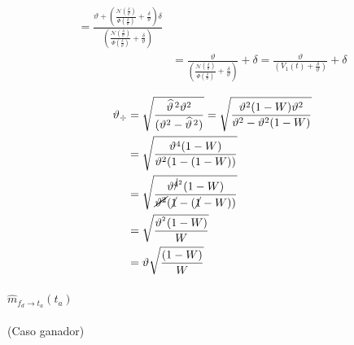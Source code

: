 \documentclass[11pt,twoside,spanish]{report} %
\begin{document}
\begin{equation}
\begin{split}
		=   \frac{\vartheta +\left(\frac{\mathcal{N}(\frac{\delta}{\vartheta})}{\Phi(\frac{\delta}{\vartheta})}+ \frac{\delta}{\vartheta}\right)\delta}  {\left(\frac{\mathcal{N}(\frac{\delta}{\vartheta})}{\Phi(\frac{\delta}{\vartheta})}+ \frac{\delta}{\vartheta}\right) }\\
		&=   \frac{\vartheta}  {\left(\frac{\mathcal{N}(\frac{\delta}{\vartheta})}{\Phi(\frac{\delta}{\vartheta})}+ \frac{\delta}{\vartheta}\right) } +  \delta
		=   \frac{\vartheta}  {\left(V_1(t)+ \frac{\delta}{\vartheta}\right) } +  \delta
	\end{split}
\end{equation}

\begin{equation}
	\begin{split}
		\vartheta_{\div} &= \sqrt{\frac{\widehat{\vartheta}^{\,2}\vartheta^2}{(\vartheta^2 - \widehat{\vartheta}^{\,2})}}
		= \sqrt{\frac{\vartheta^2(1-W)\vartheta^2}{\vartheta^2-\vartheta^2(1-W)}}\\
		&= \sqrt{\frac{\vartheta^4(1-W)}{\vartheta^2(1-(1-W))}}\\
		&= \sqrt{\frac{\vartheta^{\cancel{4}^2}(1-W)}{\cancel{\vartheta^2}(\cancel{1}-(\cancel{1}-W))}}\\
		&= \sqrt{\frac{\vartheta^{^2}(1-W)}{W}}\\
		&=\vartheta \sqrt{\frac{(1-W)}{W}}
	\end{split}
\end{equation}






\paragraph{$\widehat{m}_{f_d \rightarrow t_a}(t_a)$} (Caso ganador)
\end{document}

